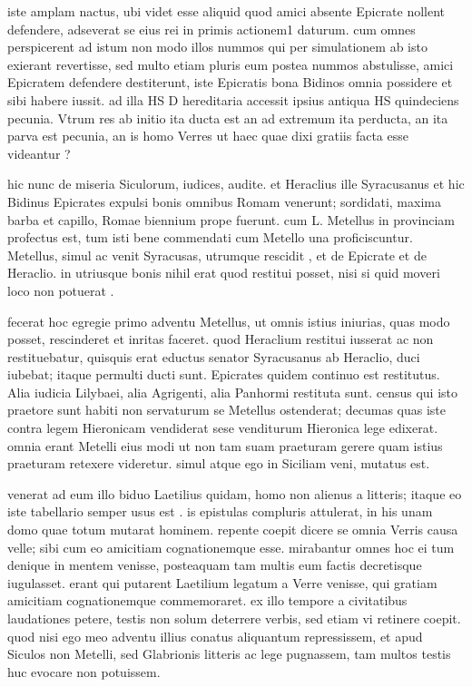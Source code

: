  iste amplam nactus, ubi videt esse aliquid quod amici absente Epicrate nollent defendere, adseverat se eius rei in primis actionem1 daturum. cum omnes perspicerent ad istum non modo illos nummos qui per simulationem ab isto exierant revertisse, sed multo etiam pluris eum postea nummos abstulisse, amici Epicratem defendere destiterunt, iste Epicratis bona Bidinos omnia possidere et sibi habere iussit. ad illa HS D hereditaria accessit ipsius antiqua HS quindeciens pecunia. Vtrum res ab initio ita ducta est an ad extremum ita perducta, an ita parva est pecunia, an is homo Verres ut haec quae dixi gratiis facta esse videantur ?

 hic nunc de miseria Siculorum, iudices, audite. et Heraclius ille Syracusanus et hic Bidinus Epicrates expulsi bonis omnibus Romam venerunt; sordidati, maxima barba et capillo, Romae biennium prope fuerunt. cum L. Metellus in provinciam profectus est, tum isti bene commendati cum Metello una proficiscuntur. Metellus, simul ac venit Syracusas, utrumque rescidit , et de Epicrate et de Heraclio. in utriusque bonis nihil erat quod restitui posset, nisi si quid moveri loco non potuerat .

 fecerat hoc egregie primo adventu Metellus, ut omnis istius iniurias, quas modo posset, rescinderet et inritas faceret. quod Heraclium restitui iusserat ac non restituebatur, quisquis erat eductus senator Syracusanus ab Heraclio, duci iubebat; itaque permulti ducti sunt. Epicrates quidem continuo est restitutus. Alia iudicia Lilybaei, alia Agrigenti, alia Panhormi restituta sunt. census qui isto praetore sunt habiti non servaturum se Metellus ostenderat; decumas quas iste contra legem Hieronicam vendiderat sese venditurum Hieronica lege edixerat. omnia erant Metelli eius modi ut non tam suam praeturam gerere quam istius praeturam retexere videretur. simul atque ego in Siciliam veni, mutatus est.

 venerat ad eum illo biduo Laetilius quidam, homo non alienus a litteris; itaque eo iste tabellario semper usus est . is epistulas compluris attulerat, in his unam domo quae totum mutarat hominem. repente coepit dicere se omnia Verris causa velle; sibi cum eo amicitiam cognationemque esse. mirabantur omnes hoc ei tum denique in mentem venisse, posteaquam tam multis eum factis decretisque iugulasset. erant qui putarent Laetilium legatum a Verre venisse, qui gratiam amicitiam cognationemque commemoraret. ex illo tempore a civitatibus laudationes petere, testis non solum deterrere verbis, sed etiam vi retinere coepit. quod nisi ego meo adventu illius conatus aliquantum repressissem, et apud Siculos non Metelli, sed Glabrionis litteris ac lege pugnassem, tam multos testis huc evocare non potuissem.

